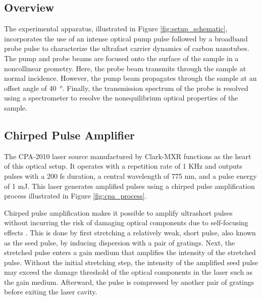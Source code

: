 \subsection{Overview}
The experimental apparatus, illustrated in Figure \ref{fig:setup_schematic}, incorporates the use of an intense optical pump pulse followed by a broadband probe pulse to characterize the ultrafast carrier dynamics of carbon nanotubes. The pump and probe beams are focused onto the surface of the sample in a noncollinear geometry. Here, the probe beam transmits through the sample at normal incidence. However, the pump beam propagates through the sample at an offset angle of \SI{40}{\degree}. Finally, the transmission spectrum of the probe is resolved using a spectrometer to resolve the nonequilibrium optical properties of the sample.





\subsection{Chirped Pulse Amplifier}
The CPA-2010 laser source manufactured by Clark-MXR functions as the heart of this optical setup. It operates with a repetition rate of 1 KHz and outputs pulses with a 200 fs duration, a central wavelength of 775 nm, and a pulse energy of 1 mJ. This laser generates amplified pulses using a chirped pulse amplification process illustrated in Figure \ref{fig:cpa_process}.

Chirped pulse amplification makes it possible to amplify ultrashort pulses without incurring the risk of damaging optical components due to self-focusing effects \cite{strickland1985compression}. This is done by first stretching a relatively weak, short pulse, also known as the seed pulse, by inducing dispersion with a pair of gratings. Next, the stretched pulse enters a gain medium that amplifies the intensity of the stretched pulse. Without the initial stretching step, the intensity of the amplified seed pulse may exceed the damage threshold of the optical components in the laser such as the gain medium. Afterward, the pulse is compressed by another pair of gratings before exiting the laser cavity.

